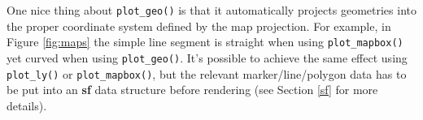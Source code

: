 \documentclass[
  12pt,
]{krantz}
\newenvironment{Shaded}{\begin{snugshade}}{\end{snugshade}}
\newcommand{\DataTypeTok}[1]{\textcolor[rgb]{0.13,0.29,0.53}{#1}}
\newcommand{\DecValTok}[1]{\textcolor[rgb]{0.00,0.00,0.81}{#1}}
\newcommand{\KeywordTok}[1]{\textcolor[rgb]{0.13,0.29,0.53}{\textbf{#1}}}
\newcommand{\NormalTok}[1]{#1}
\newcommand{\OperatorTok}[1]{\textcolor[rgb]{0.81,0.36,0.00}{\textbf{#1}}}
\newcommand{\StringTok}[1]{\textcolor[rgb]{0.31,0.60,0.02}{#1}}
\begin{document}
One nice thing about \texttt{plot\_geo()} is that it automatically projects geometries into the proper coordinate system defined by the map projection. For example, in Figure \ref{fig:maps} the simple line segment is straight when using \texttt{plot\_mapbox()} yet curved when using \texttt{plot\_geo()}. It's possible to achieve the same effect using \texttt{plot\_ly()} or \texttt{plot\_mapbox()}, but the relevant marker/line/polygon data has to be put into an \textbf{sf} data structure before rendering (see Section \ref{sf} for more details).

\begin{Shaded}
\end{Shaded}
\end{document}
